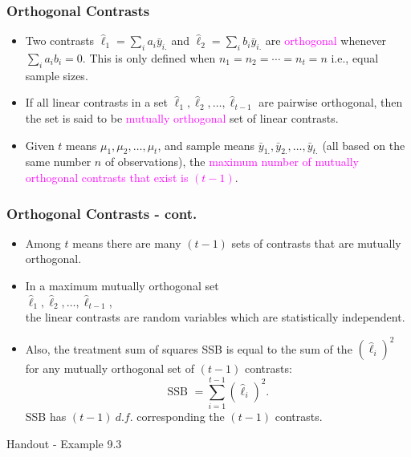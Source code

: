 \documentclass[xcolor=dvipsnames,12pt]{beamer}
\begin{document}
\begin{frame}
\frametitle{Orthogonal Contrasts}
\begin{itemize}
\item Two contrasts $\hat{\ell}_1 = \sum_i a_i \bar{y}_{i.}$ and
$\hat{\ell}_2 = \sum_i b_i \bar{y}_{i.}$ are {\textcolor{magenta}{orthogonal}}
whenever $\sum_i a_i b_i = 0$.  This is only defined when
$n_1 = n_2 = \cdots = n_t = n$ i.e., equal sample sizes.  
\item If all linear contrasts in a set $\hat{\ell}_1, \hat{\ell}_2, \ldots, \hat{\ell}_{t-1}$
 are pairwise orthogonal, then the set is said to be  {\textcolor{magenta}{mutually orthogonal}} set of linear contrasts.
\item Given $t$ means $\mu_1, \mu_2, \ldots, \mu_t$, and sample means
$\bar{y}_{1.}, \bar{y}_{2.}, \ldots, \bar{y}_{t.}$ (all based on
the same number $n$ of observations), the
{\textcolor{magenta}{maximum number of mutually orthogonal contrasts that exist is $(t-1)$}}. 
 \end{itemize}
\end{frame}



\begin{frame}
\frametitle{Orthogonal Contrasts - cont.}
\begin{itemize}
\item Among $t$ means there are many  $(t-1)$ sets of
contrasts that are  mutually orthogonal.
\item In a maximum mutually orthogonal set \\[.05in]
\hspace*{1in} $\hat{\ell}_1,\hat{\ell}_2, \ldots, \hat{\ell}_{t-1}$,\\[.05in]
 the linear contrasts are random variables which are statistically independent.

\item Also, the treatment sum of squares SSB is equal to the sum of the
$(\hat{\ell}_i)^2$ for any mutually orthogonal set of $(t-1)$
contrasts:
$$
  \mbox{SSB } = \sum_{i=1}^{t-1} (\hat{\ell}_i)^2.
$$
 SSB has  $(t-1)\ d.f.$ corresponding the $(t-1)$
contrasts. 
 \end{itemize}
\end{frame}


\begin{frame}
Handout - Example 9.3
\end{frame}
\end{document}
